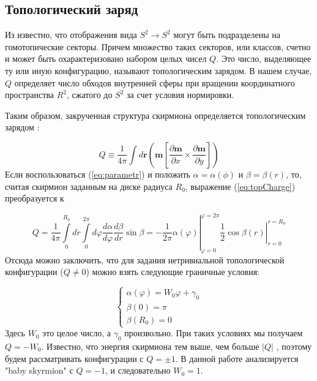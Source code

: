\documentclass[a4paper,article,14pt]{extarticle}
\begin{document}
\subsection{Топологический заряд}

Из \cite{book:rajaraman} известно, что отображения вида $S^2 \rightarrow S^2$ могут быть подразделены на гомотопические секторы. Причем множество таких секторов, или классов, счетно и может быть охарактеризовано набором целых чисел $Q$. Это число, выделяющее ту или иную конфигурацию, называют топологическим зарядом. В нашем случае, $Q$ определяет число обходов внутренней сферы при вращении координатного пространства $R^2$, сжатого до $S^2$ за счет условия нормировки.

Таким образом, закрученная структура скирмиона определяется топологическим зарядом \cite{book:rajaraman}:

\begin{equation}
\label{eq:topCharge}
Q \equiv \frac{1}{{4\pi }}\int {d{\mathbf{r}}\left( {{\mathbf{m}}\left[ {\frac{{\partial {\mathbf{m}}}}{{\partial x}} \times \frac{{\partial {\mathbf{m}}}}{{\partial y}}} \right]} \right)}
\end{equation}
Если воспользоваться (\ref{eq:parametr}) и положить $\alpha = \alpha(\phi)$ и $\beta = \beta (r)$, то, считая скирмион заданным на диске радиуса $R_0$,  выражение (\ref{eq:topCharge}) преобразуется к

\[\left. {Q = \frac{1}{{4\pi }}\int\limits_0^{{R_0}} {dr\int\limits_0^{2\pi } {d\varphi } } \frac{{d\alpha }}{{d\varphi }}\frac{{d\beta }}{{dr}}\sin \beta  =  - \frac{1}{{2\pi }}\alpha \left( \varphi  \right)} \right|_{\varphi  = 0}^{\varphi  = 2\pi }\left. {\frac{1}{2}\cos \beta \left( r \right)} \right|_{r = 0}^{r = {R_0}}\]
Отсюда можно заключить, что для задания нетривиальной топологической конфигурации ($Q \neq0$) можно взять следующие граничные условия:

\begin{equation}
\label{eq:edgeCond}
{\left\{ {\begin{array}{*{20}{c}}
  {\alpha \left( \varphi  \right) = {W_0}\varphi  + {\gamma _0}} \\ 
  {\beta (0) = \pi } \\ 
  {\beta ({R_0}) = 0} 
\end{array}} \right.}
\end{equation}
Здесь $W_0$ это целое число, а $\gamma _0$ произвольно. При таких условиях мы получаем $Q=-W_0$. Известно, что энергия скирмиона тем выше, чем больше $|Q|$ \cite{book:rajaraman}, поэтому будем рассматривать конфигурации с $Q=\pm 1$. В данной работе анализируется "baby skyrmion" с $Q=-1$, и следовательно $W_0 = 1$.
\end{document}
